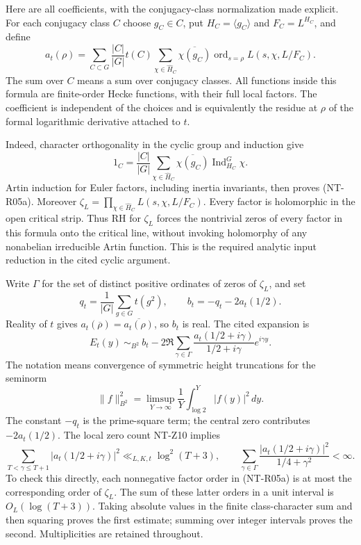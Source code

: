 Here are all coefficients, with the conjugacy-class normalization
made explicit. For each conjugacy class $C$ choose $g_C\in C$,
put $H_C=\langle g_C\rangle$ and $F_C=L^{H_C}$, and define
\[
 a_t(\rho)=\sum_{C\subset G}\frac{|C|}{|G|}t(C)
       \sum_{\chi\in\widehat H_C}\overline{\chi(g_C)}
             \operatorname{ord}_{s=\rho}L(s,\chi,L/F_C).
 \tag{NT-R05a}
\]
The sum over $C$ means a sum over conjugacy classes. All functions
inside this formula are finite-order Hecke functions, with their
full local factors. The coefficient is independent of the choices
and is equivalently the residue at $\rho$ of the formal logarithmic
derivative attached to $t$.

Indeed, character orthogonality in the cyclic group and induction give
\[
 1_C=\frac{|C|}{|G|}
       \sum_{\chi\in\widehat H_C}\overline{\chi(g_C)}
                \operatorname{Ind}_{H_C}^G\chi.
\]
Artin induction for Euler factors, including inertia invariants,
then proves (NT-R05a). Moreover
$\zeta_L=\prod_{\chi\in\widehat H_C}L(s,\chi,L/F_C)$.
Every factor is holomorphic in the open critical strip. Thus RH for
$\zeta_L$ forces the nontrivial zeros of every factor in this formula
onto the critical line, without invoking holomorphy of any
nonabelian irreducible Artin function. This is the required analytic
input reduction in the cited cyclic argument.

Write $\Gamma$ for the set of distinct positive ordinates of zeros
of $\zeta_L$, and set
\[
 q_t=\frac1{|G|}\sum_{g\in G}t(g^2),\qquad
 b_t=-q_t-2a_t(1/2).
\]
Reality of $t$ gives $a_t(\overline\rho)=\overline{a_t(\rho)}$,
so $b_t$ is real. The cited expansion is
\[
 E_t(y)\ \sim_{B^2}\ b_t-
       2\Re\sum_{\gamma\in\Gamma}
        \frac{a_t(1/2+i\gamma)}{1/2+i\gamma}e^{i\gamma y}.
 \tag{NT-R05b}
\]
The notation means convergence of symmetric height truncations for
the seminorm
\[
 \|f\|_{B^2}^2=\limsup_{Y\to\infty}\frac1Y
                     \int_{\log2}^Y|f(y)|^2\,dy.
\]
The constant $-q_t$ is the prime-square term; the central zero
contributes $-2a_t(1/2)$. The local zero count NT-Z10 implies
\[
 \sum_{T<\gamma\le T+1}|a_t(1/2+i\gamma)|^2
       \ll_{L,K,t}\log^2(T+3),\qquad
 \sum_{\gamma\in\Gamma}
 \frac{|a_t(1/2+i\gamma)|^2}{1/4+\gamma^2}<\infty.
 \tag{NT-R05c}
\]
To check this directly, each nonnegative factor order in
(NT-R05a) is at most the corresponding order of $\zeta_L$.
The sum of these latter orders in a unit interval is $O_L(\log(T+3))$.
Taking absolute values in the finite class-character sum and then
squaring proves the first estimate; summing over integer intervals
proves the second. Multiplicities are retained throughout.

